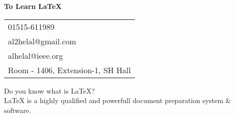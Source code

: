 \documentclass{article}
\begin{document}
\vspace*{\fill}
\begin{center}
  {\LARGE\textbf{To Learn \LaTeX{}}}
\\
\vspace{2cm}
  \begin{tabular}{l}
 \faPhone{} 01515-611989\\
  \faEnvelope{} al2helal@gmail.com\\
  \faEnvelope{} alhelal@ieee.org\\
  \faHome{} Room - 1406, Extension-1, SH Hall
  \end{tabular}

\vspace{2cm}
Do you know what is \LaTeX{}?\\
  \LaTeX{} is a highly qualified and powerfull document preparation system \& software.
\end{center}
\vspace*{\fill}
 
\end{document}
